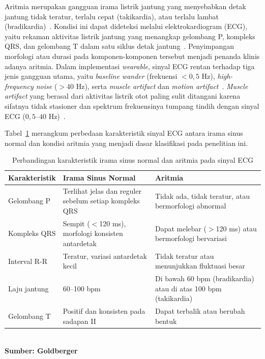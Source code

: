 Aritmia merupakan gangguan irama listrik jantung yang menyebabkan detak jantung tidak teratur, terlalu cepat (takikardia), atau terlalu lambat (bradikardia)~\cite{ecg_goldberger}. Kondisi ini dapat dideteksi melalui elektrokardiogram (ECG), yaitu rekaman aktivitas listrik jantung yang menangkap gelombang P, kompleks QRS, dan gelombang T dalam satu siklus detak jantung~\cite{ecg_goldberger}. Penyimpangan morfologi atau durasi pada komponen-komponen tersebut menjadi penanda klinis adanya aritmia. Dalam implementasi \textit{wearable}, sinyal ECG rentan terhadap tiga jenis gangguan utama, yaitu \textit{baseline wander} (frekuensi $< 0{,}5$ Hz), \textit{high-frequency noise} ($> 40$ Hz), serta \textit{muscle artifact} dan \textit{motion artifact}~\cite{zambrano_2026, jia_2024}. \textit{Muscle artifact} yang berasal dari aktivitas listrik otot paling sulit ditangani karena sifatnya tidak stasioner dan spektrum frekuensinya tumpang tindih dengan sinyal ECG ($0{,}5$--$40$ Hz)~\cite{jia_2024}.

Tabel~\ref{tab:perbandingan-irama} merangkum perbedaan karakteristik
sinyal ECG antara irama sinus normal dan kondisi aritmia yang menjadi
dasar klasifikasi pada penelitian ini.

\begin{table}[!ht]
  \centering
  \caption{Perbandingan karakteristik irama sinus normal dan aritmia
           pada sinyal ECG}
  \label{tab:perbandingan-irama}
  \small
  \begin{tabular}{p{3.0cm}p{4.5cm}p{4.5cm}}
    \toprule
    \textbf{Karakteristik} &
    \textbf{Irama Sinus Normal} &
    \textbf{Aritmia} \\
    \midrule
    Gelombang P &
    Terlihat jelas dan reguler sebelum setiap kompleks QRS &
    Tidak ada, tidak teratur, atau bermorfologi abnormal \\
    Kompleks QRS &
    Sempit ($<$120 ms), morfologi konsisten antardetak &
    Dapat melebar ($>$120 ms) atau bermorfologi bervariasi \\
    Interval R-R &
    Teratur, variasi antardetak kecil &
    Tidak teratur atau menunjukkan fluktuasi besar \\
    Laju jantung &
    60--100 bpm &
    Di bawah 60 bpm (bradikardia) atau di atas 100 bpm (takikardia) \\
    Gelombang T &
    Positif dan konsisten pada sadapan II &
    Dapat terbalik atau berubah bentuk \\
    \bottomrule
  \end{tabular}
  \smallskip\\
  \small\textbf{Sumber: Goldberger~\cite{ecg_goldberger}}
\end{table}

